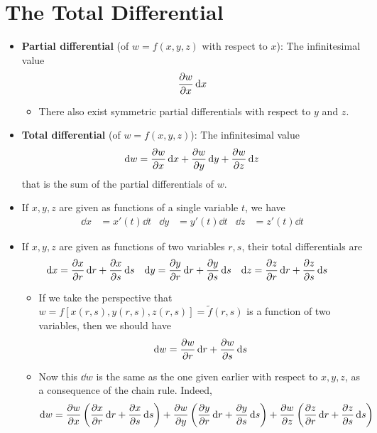 \documentclass[../main.tex]{subfiles}
\begin{document}
\section{The Total Differential}
\begin{itemize}
    \item \textbf{Partial differential} (of $w=f(x,y,z)$ with respect to $x$): The infinitesimal value
    \begin{equation*}
        \pdv{w}{x}\dd{x}
    \end{equation*}
    \begin{itemize}
        \item There also exist symmetric partial differentials with respect to $y$ and $z$.
    \end{itemize}
    \item \textbf{Total differential} (of $w=f(x,y,z)$): The infinitesimal value
    \begin{equation*}
        \dd{w} = \pdv{w}{x}\dd{x}+\pdv{w}{y}\dd{y}+\pdv{w}{z}\dd{z}
    \end{equation*}
    that is the sum of the partial differentials of $w$.
    \item If $x,y,z$ are given as functions of a single variable $t$, we have
    \begin{align*}
        \dd{x} &= x'(t)\dd{t}&
            \dd{y} &= y'(t)\dd{t}&
                \dd{z} &= z'(t)\dd{t}
    \end{align*}
    \item If $x,y,z$ are given as functions of two variables $r,s$, their total differentials are
    \begin{align*}
        \dd{x} &= \pdv{x}{r}\dd{r}+\pdv{x}{s}\dd{s}&
            \dd{y} &= \pdv{y}{r}\dd{r}+\pdv{y}{s}\dd{s}&
                \dd{z} &= \pdv{z}{r}\dd{r}+\pdv{z}{s}\dd{s}
    \end{align*}
    \begin{itemize}
        \item If we take the perspective that $w=f[x(r,s),y(r,s),z(r,s)]=\tilde{f}(r,s)$ is a function of two variables, then we should have
        \begin{equation*}
            \dd{w} = \pdv{w}{r}\dd{r}+\pdv{w}{s}\dd{s}
        \end{equation*}
        \item Now this $\dd{w}$ is the same as the one given earlier with respect to $x,y,z$, as a consequence of the chain rule. Indeed,
        \begin{align*}
            \dd{w} &= \pdv{w}{x}\left( \pdv{x}{r}\dd{r}+\pdv{x}{s}\dd{s} \right)+\pdv{w}{y}\left( \pdv{y}{r}\dd{r}+\pdv{y}{s}\dd{s} \right)+\pdv{w}{z}\left( \pdv{z}{r}\dd{r}+\pdv{z}{s}\dd{s} \right)\\

\end{align*}
\end{itemize}
\end{itemize}
\end{document}
